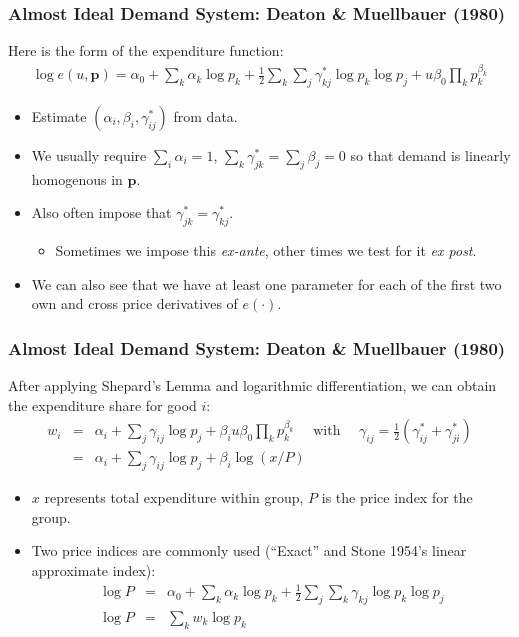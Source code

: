 \documentclass[xcolor=pdftex,dvipsnames,table,mathserif,aspectratio=169]{beamer}
\begin{document}
\begin{frame}
\frametitle{Almost Ideal Demand System: Deaton \& Muellbauer (1980)}
\small
Here is the form of the expenditure function:
\begin{eqnarray*}
\log e(u,\mathbf{p}) =  \alpha_0 + \sum_k \alpha_k \log p_k + \frac{1}{2} \sum_k \sum_j \gamma_{kj}^{*} \log p_k \log p_j + u \beta_0 \prod_k p_k^{\beta_k}
\end{eqnarray*}
\begin{itemize}
\item Estimate $(\alpha_i, \beta_i, \gamma_{ij}^*)$ from data.
\item We usually require $\sum_i \alpha_i =1$, $\sum_k \gamma_{jk}^* = \sum_j  \beta_j = 0$ so that demand is linearly homogenous in $\mathbf{p}$.
\item Also often impose that $\gamma_{jk}^* = \gamma_{kj}^*$.
\begin{itemize}
\item Sometimes we impose this \textit{ex-ante}, other times we test for it \textit{ex post}.
\end{itemize}
\item We can also see that we have at least one parameter for each of the first two own and cross price derivatives of $e(\cdot)$.
\end{itemize}
\end{frame}

\begin{frame}
\frametitle{Almost Ideal Demand System: Deaton \& Muellbauer (1980)}
\small
After applying Shepard's Lemma and logarithmic differentiation, we can obtain the expenditure share for good $i$:
\begin{eqnarray*}
w_i &=&\alpha_i + \sum_j \gamma_{ij} \log p_j + \beta_i u \beta_0 \prod_k p_k^{\beta_k} \quad \mbox{ with } \quad \gamma_{ij}= \frac{1}{2} (\gamma_{ij}^* + \gamma_{ji}^*) \\
      &=& \alpha_i + \sum_j \gamma_{ij} \log p_j + \beta_i \log (x / P)
\end{eqnarray*}
\vspace{-0.5cm}
\begin{itemize}
\item $x$ represents total expenditure within group, $P$ is the price index for the group.
\item Two price indices are commonly used (``Exact'' and Stone 1954's linear approximate index):
\begin{eqnarray*}
\log P &=&\alpha_0 + \sum_k \alpha_k \log p_k + \frac{1}{2} \sum_j \sum_k \gamma_{kj} \log p_k \log p_j\\
\log P &=& \sum_k w_k \log p_k
\end{eqnarray*}
\end{itemize}
\end{frame}
\end{document}
